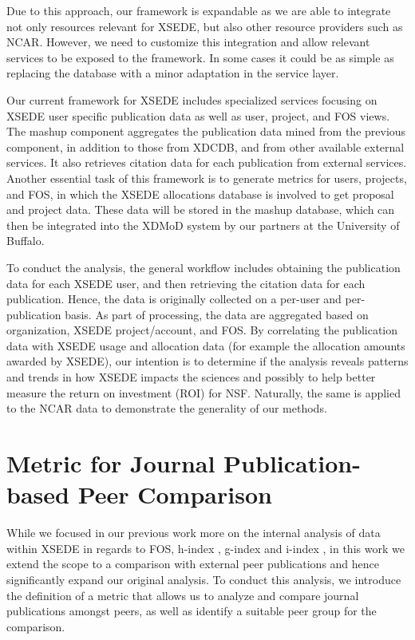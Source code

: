 \documentclass[10pt, conference, compsocconf]{IEEEtran}
\begin{document}
Due to this approach, our framework is expandable as we are able to integrate not only resources relevant for XSEDE, but also other resource providers such as NCAR. However, we need to customize this integration and allow relevant services to be exposed to the framework. In some cases it could be as simple as replacing the database with a minor adaptation in the service layer.



Our current framework for XSEDE includes specialized services focusing on XSEDE user specific publication data as well as user, project, and FOS views. The mashup component aggregates the publication data mined from the previous component, in addition to those from XDCDB, and from other available external services. It also retrieves citation data for each publication from external services. Another essential task of this framework is to generate metrics for users, projects, and FOS, in which the XSEDE allocations database is involved to get proposal and project data. These data will be stored in the mashup database, which can then be integrated into the XDMoD system \cite{Furlani:2013:UXF:2484762.2484763} by our partners at the University of Buffalo.

To conduct the analysis, the general workflow includes obtaining the publication data for each XSEDE user, and then retrieving the citation data for each publication. Hence, the data is originally collected on a per-user and per-publication basis. As part of processing, the data are aggregated based on organization, XSEDE project/account, and FOS.  By correlating the publication data with XSEDE usage and allocation data (for example the allocation amounts awarded by XSEDE), our intention is to determine if the analysis reveals patterns and trends in how XSEDE impacts the sciences and possibly to help better measure the return on investment (ROI) for NSF. Naturally, the same is applied to the NCAR data to demonstrate the generality of our methods.

\section{Metric for Journal Publication-based Peer Comparison} \label{S:metric}

While we focused in our previous work more on the internal analysis of data within XSEDE in regards to FOS, h-index \cite{hirsch2005index}, g-index \cite{www-i10index} and i-index \cite{egghe2006theory}, in this work we extend the scope to a comparison with external peer publications and hence significantly expand our original analysis. To conduct this analysis, we introduce the definition of a metric that allows us to analyze and compare journal publications amongst peers, as well as identify a suitable peer group for the comparison.
\end{document}
